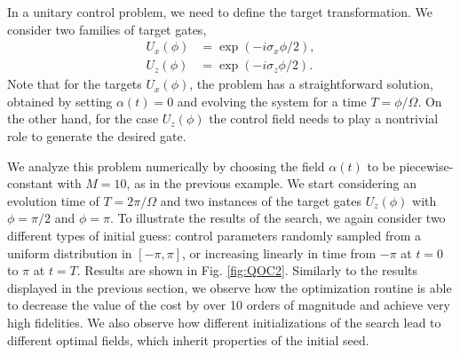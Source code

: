 In a unitary control problem, we need to define the target transformation. We consider two families of target gates,
\begin{align}
    U_x(\phi) &= \exp\left(-i \sigma_x \phi/2\right), \label{eq:QOC_gate_target_x}\\
    U_z(\phi) &= \exp\left(-i \sigma_z \phi/2\right). \label{eq:QOC_gate_target_z}
\end{align}
Note that for the targets $U_x(\phi)$, the problem has a straightforward solution, obtained by setting $\alpha(t)=0$ and evolving the system for a time $T=\phi/\Omega$. On the other hand, for the case $U_z(\phi)$ the control field needs to play a nontrivial role to generate the desired gate. 

We analyze this problem numerically by choosing the field $\alpha(t)$ to be piecewise-constant with $M=10$, as in the previous example. We start considering an evolution time of $T=2\pi/\Omega$ and two instances of the target gates $U_z(\phi)$ with $\phi=\pi/2$ and $\phi = \pi$. To illustrate the results of the search, we again consider two different types of initial guess: control parameters randomly sampled from a uniform distribution in $[-\pi,\pi]$, or increasing linearly in time from $-\pi$ at $t=0$ to $\pi$ at $t=T$. Results are shown in Fig. \ref{fig:QOC2}. Similarly to the results displayed in the previous section, we observe how the optimization routine is able to decrease the value of the cost by over 10 orders of magnitude and achieve very high fidelities. We also observe how different initializations of the search lead to different optimal fields, which inherit properties of the initial seed.\\

